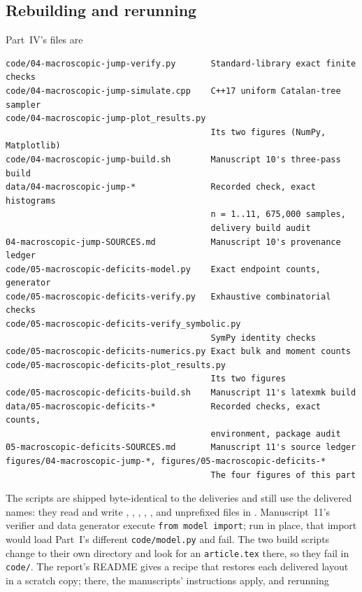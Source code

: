 \documentclass[11pt,a4paper]{article}
\theoremstyle{definition}\newaliascnt{definition}{theorem}
\theoremstyle{remark}\newaliascnt{remark}{theorem}
\begin{document}
\subsection{Rebuilding and rerunning}
\label{mj:sec:reproduce}
Part~IV's files are
\begin{lstlisting}
code/04-macroscopic-jump-verify.py       Standard-library exact finite checks
code/04-macroscopic-jump-simulate.cpp    C++17 uniform Catalan-tree sampler
code/04-macroscopic-jump-plot_results.py
                                         Its two figures (NumPy, Matplotlib)
code/04-macroscopic-jump-build.sh        Manuscript 10's three-pass build
data/04-macroscopic-jump-*               Recorded check, exact histograms
                                         n = 1..11, 675,000 samples,
                                         delivery build audit
04-macroscopic-jump-SOURCES.md           Manuscript 10's provenance ledger
code/05-macroscopic-deficits-model.py    Exact endpoint counts, generator
code/05-macroscopic-deficits-verify.py   Exhaustive combinatorial checks
code/05-macroscopic-deficits-verify_symbolic.py
                                         SymPy identity checks
code/05-macroscopic-deficits-numerics.py Exact bulk and moment counts
code/05-macroscopic-deficits-plot_results.py
                                         Its two figures
code/05-macroscopic-deficits-build.sh    Manuscript 11's latexmk build
data/05-macroscopic-deficits-*           Recorded checks, exact counts,
                                         environment, package audit
05-macroscopic-deficits-SOURCES.md       Manuscript 11's source ledger
figures/04-macroscopic-jump-*, figures/05-macroscopic-deficits-*
                                         The four figures of this part
\end{lstlisting}
The scripts are shipped byte-identical to the deliveries and still use the
delivered names: they read and write ,
, ,
, ,
 and unprefixed files in . Manuscript~11's verifier and data
generator execute \texttt{from model import}; run in place, that import would
load Part~I's different \texttt{code/model.py} and fail. The two build scripts
change to their own directory and look for an \texttt{article.tex} there, so
they fail in \texttt{code/}. The
report's README gives a recipe that restores each delivered layout in a
scratch copy; there, the manuscripts' instructions apply, and rerunning
\end{document}
